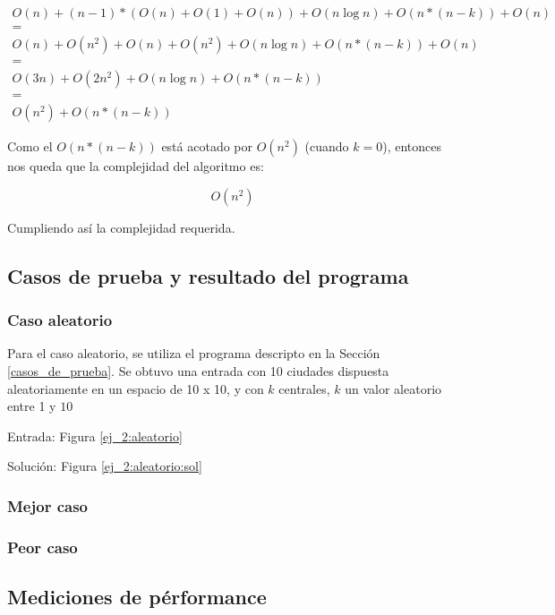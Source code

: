 \begin{equation}
\label{ej_2:cota:formula}
\begin{split}
	O(n) + (n-1)*(O(n) + O(1) + O(n)) + O(n \log n) + O(n*(n - k)) + O(n) \\
= \\
O(n) + O(n^2) + O(n) + O(n^2) + O(n \log n) + O(n*(n - k)) + O(n)\\
= \\
O(3n) + O(2n^2) + O(n \log n) + O(n*(n - k))\\
= \\
O(n^2) + O(n*(n - k))
\end{split}
\end{equation}

Como el $O(n*(n - k))$ est\'a acotado por $O(n^2)$ (cuando $k = 0$), entonces nos queda que la complejidad del algoritmo es:

\begin{equation*}
	O(n^2)
\end{equation*}

Cumpliendo as\'i la complejidad requerida.

\subsection{Casos de prueba y resultado del programa} \label{ej_2:casos}

\subsubsection{Caso aleatorio}
Para el caso aleatorio, se utiliza el programa descripto en la Secci\'on \ref{casos_de_prueba}. Se obtuvo una entrada con 10 ciudades dispuesta aleatoriamente en un espacio de 10 x 10, y con $k$ centrales, $k$ un valor aleatorio entre 1 y $10$

Entrada: Figura \ref{ej_2:aleatorio}


Soluci\'on: Figura \ref{ej_2:aleatorio:sol}


\subsubsection{Mejor caso}

\subsubsection{Peor caso}

\subsection{Mediciones de p\'erformance} \label{ej_2:performance}

